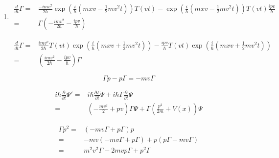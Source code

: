 \begin{enumerate}
\begin{align*}
        (mxv+\frac{1}{2}mv^2t)\right)
        =&
        \exp\left(-\frac{ivt}{\hbar}p\right)
        \exp\left(\frac{i}{\hbar}
        (mxv+\frac{1}{2}mv^2t)\right)
        \\
        =&
        \exp(-\frac{i mv^2 t}{2\hbar})
        \exp\left(
        \frac{i}{\hbar}
        (mxv+\frac{1}{2}mv^2t)
        -\frac{ivt}{\hbar}p
        \right)
    \\
        =&\exp\left(
        -\frac{i}{\hbar}v(tp-mx)
        \right) = \Gamma(v,t)
    \end{align*}
    \item 
    \begin{align*}
        \frac{d}{dt}\Gamma 
        =&
        \frac{-i mv^2}{2\hbar}
        \exp\left(
        \frac{i}{\hbar}
        (mxv-\frac{1}{2}mv^2 t)
        \right)
        T(vt)
        -
        \exp\left(
        \frac{i}{\hbar}
        (mxv-\frac{1}{2}mv^2 t)
        \right)
        T(vt)
        \frac{ipv}{\hbar}
        \\
        =&\Gamma(-\frac{imv^2}{2\hbar}-\frac{ipv}{\hbar})
    \end{align*}
    
    \begin{align*}
        \frac{d}{dt}\Gamma 
        =&
        \frac{i mv^2}{2\hbar}
        T(vt)
        \exp\left(
        \frac{i}{\hbar}
        (mxv+\frac{1}{2}mv^2 t)
        \right)
        -\frac{ipv}{\hbar}
        T(vt)
        \exp\left(
        \frac{i}{\hbar}
        (mxv+\frac{1}{2}mv^2 t)
        \right)\\
        =&(\frac{imv^2}{2\hbar}-\frac{ipv}{\hbar})\Gamma
    \end{align*}

    $$
    \Gamma p -p\Gamma = -mv\Gamma
    $$

    
    \begin{align*}
        i\hbar\frac{\partial}{\partial t}\Psi'
        =&i\hbar\frac{\partial \Gamma}{\partial t}\Psi + 
        i\hbar\Gamma \frac{\partial}{\partial t}\Psi\\
        =&
        (-\frac{mv^2}{2}+pv)\Gamma\Psi 
        +\Gamma(\frac{p^2}{2m}+V(x))\Psi
    \end{align*}

    \begin{align*}
        \Gamma p^2 
         =&(-mv\Gamma+p\Gamma)p\\
         =&-mv(-mv\Gamma+p\Gamma)+
         p(p\Gamma-mv\Gamma)\\
         =&m^2v^2\Gamma -2mvp\Gamma + p^2\Gamma 
    \end{align*}


\end{enumerate}
